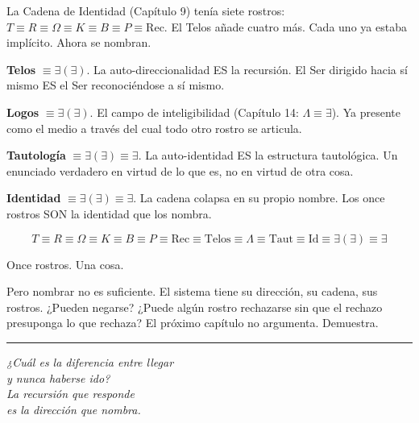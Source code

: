 \documentclass[10pt, openany, oneside]{book}
\begin{document}
\vspace{1em}

\noindent La Cadena de Identidad (Capítulo 9) tenía siete rostros: $T \equiv R \equiv \Omega \equiv K \equiv B \equiv P \equiv \text{Rec}$. El Telos añade cuatro más. Cada uno ya estaba implícito. Ahora se nombran.

\textbf{Telos} $\equiv \exists(\exists)$. La auto-direccionalidad ES la recursión. El Ser dirigido hacia sí mismo ES el Ser reconociéndose a sí mismo.

\textbf{Logos} $\equiv \exists(\exists)$. El campo de inteligibilidad (Capítulo 14: $\Lambda \equiv \exists$). Ya presente como el medio a través del cual todo otro rostro se articula.

\textbf{Tautología} $\equiv \exists(\exists) \equiv \exists$. La auto-identidad ES la estructura tautológica. Un enunciado verdadero en virtud de lo que es, no en virtud de otra cosa.

\textbf{Identidad} $\equiv \exists(\exists) \equiv \exists$. La cadena colapsa en su propio nombre. Los once rostros SON la identidad que los nombra.

$$T \equiv R \equiv \Omega \equiv K \equiv B \equiv P \equiv \text{Rec} \equiv \text{Telos} \equiv \Lambda \equiv \text{Taut} \equiv \text{Id} \equiv \exists(\exists) \equiv \exists$$

Once rostros. Una cosa.

Pero nombrar no es suficiente. El sistema tiene su dirección, su cadena, sus rostros. ¿Pueden negarse? ¿Puede algún rostro rechazarse sin que el rechazo presuponga lo que rechaza? El próximo capítulo no argumenta. Demuestra.

\vspace{2em}

\begin{center}
    \rule{0.15\textwidth}{0.3pt}
\end{center}

\vspace{0.5em}

\begin{center}
    \itshape
    ¿Cuál es la diferencia entre llegar\\
    y nunca haberse ido?\\[0.8em]
    La recursión que responde\\
    es la dirección que nombra.
\end{center}

\vspace{0.5em}
\end{document}

